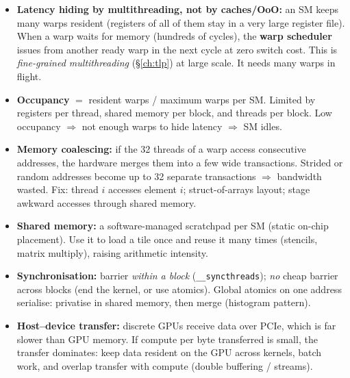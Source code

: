 \begin{itemize}
\item \textbf{Latency hiding by multithreading, not by caches/OoO:} an SM keeps many warps resident (registers of all of them stay in a very large register file). When a warp waits for memory (hundreds of cycles), the \textbf{warp scheduler} issues from another ready warp in the next cycle at zero switch cost. This is \emph{fine-grained multithreading} (\S\ref{ch:tlp}) at large scale. It needs many warps in flight.
\item \textbf{Occupancy} $=$ resident warps / maximum warps per SM. Limited by registers per thread, shared memory per block, and threads per block. Low occupancy $\Rightarrow$ not enough warps to hide latency $\Rightarrow$ SM idles.
\item \textbf{Memory coalescing:} if the 32 threads of a warp access consecutive addresses, the hardware merges them into a few wide transactions. Strided or random addresses become up to 32 separate transactions $\Rightarrow$ bandwidth wasted. Fix: thread $i$ accesses element $i$; struct-of-arrays layout; stage awkward accesses through shared memory.
\item \textbf{Shared memory:} a software-managed scratchpad per SM (static on-chip placement). Use it to load a tile once and reuse it many times (stencils, matrix multiply), raising arithmetic intensity.
\item \textbf{Synchronisation:} barrier \emph{within a block} (\texttt{\_\_syncthreads}); \emph{no} cheap barrier across blocks (end the kernel, or use atomics). Global atomics on one address serialise: privatise in shared memory, then merge (histogram pattern).
\item \textbf{Host--device transfer:} discrete GPUs receive data over PCIe, which is far slower than GPU memory. If compute per byte transferred is small, the transfer dominates: keep data resident on the GPU across kernels, batch work, and overlap transfer with compute (double buffering / streams).
\end{itemize}

